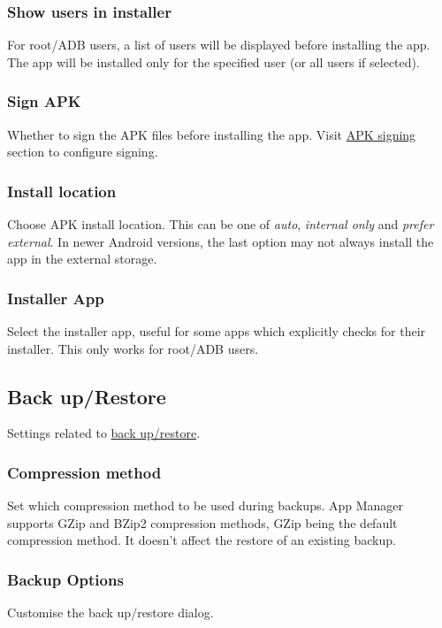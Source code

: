\subsubsection{Show users in installer}
For root/ADB users, a list of users will be displayed before installing the app.
The app will be installed only for the specified user (or all users if selected).

\subsubsection{Sign APK}
Whether to sign the APK files before installing the app.
Visit \hyperref[subsec:apk-signing]{APK signing} section to configure signing.

\subsubsection{Install location}
Choose APK install location.
This can be one of \textit{auto}, \textit{internal only} and \textit{prefer external}.
In newer Android versions, the last option may not always install the app in the external storage.

\subsubsection{Installer App}
Select the installer app, useful for some apps which explicitly checks for their installer.
This only works for root/ADB users.


\subsection{Back up/Restore}\label{subsec:backup/restore}
Settings related to \hyperref[sec:backup-restore]{back up/restore}.

\subsubsection{Compression method}
Set which compression method to be used during backups.
App Manager supports GZip and BZip2 compression methods, GZip being the default compression method.
It doesn't affect the restore of an existing backup.

\subsubsection{Backup Options}\label{subsubsec:settings-backup-options}
Customise the back up/restore dialog.

